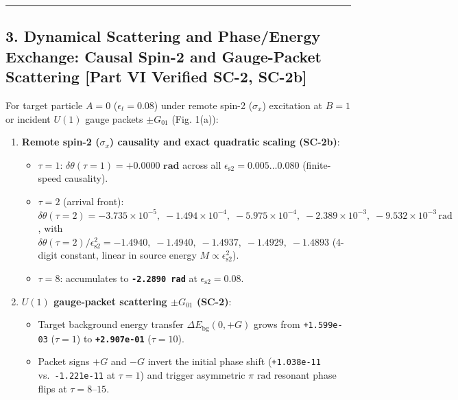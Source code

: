 \documentclass[
  a4paper,
]{article}
\providecommand{\tightlist}{%
  \setlength{\itemsep}{0pt}\setlength{\parskip}{0pt}}
\begin{document}
\begin{center}\rule{0.5\linewidth}{0.5pt}\end{center}

\subsection{3. Dynamical Scattering and Phase/Energy Exchange: Causal
Spin-2 and Gauge-Packet Scattering {[}Part VI Verified SC-2,
SC-2b{]}}\label{dynamical-scattering-and-phaseenergy-exchange-causal-spin-2-and-gauge-packet-scattering-part-vi-verified-sc-2-sc-2b}

For target particle \(A=0\) (\(\epsilon_t = 0.08\)) under remote spin-2
(\(\sigma_x\)) excitation at \(B=1\) or incident \(U(1)\) gauge packets
\(\pm G_{01}\) (Fig. 1(a)):

\begin{enumerate}
\def\labelenumi{\arabic{enumi}.}
\tightlist
\item
  \textbf{Remote spin-2 (\(\sigma_x\)) causality and exact quadratic
  scaling (SC-2b)}:

  \begin{itemize}
  \tightlist
  \item
    \(\tau = 1\):
    \textbf{\(\delta\theta(\tau=1) = \mathbf{+0.0000\text{ rad}}\)}
    across all \(\epsilon_{\mathrm{s2}} = 0.005 \dots 0.080\)
    (finite-speed causality).
  \item
    \(\tau = 2\) (arrival front):
    \(\delta\theta(\tau=2) = -3.735\times 10^{-5},\; -1.494\times 10^{-4},\; -5.975\times 10^{-4},\; -2.389\times 10^{-3},\; -9.532\times 10^{-3}\,\mathrm{rad}\),
    with
    \textbf{\(\delta\theta(\tau=2)/\epsilon_{\mathrm{s2}}^2 = \mathbf{-1.4940,\; -1.4940,\; -1.4937,\; -1.4929,\; -1.4893}\)}
    (4-digit constant, linear in source energy
    \(M \propto \epsilon_{\mathrm{s2}}^2\)).
  \item
    \(\tau = 8\): accumulates to \textbf{\texttt{-2.2890\ rad}} at
    \(\epsilon_{\mathrm{s2}} = 0.08\).
  \end{itemize}
\item
  \textbf{\(U(1)\) gauge-packet scattering \(\pm G_{01}\) (SC-2)}:

  \begin{itemize}
  \tightlist
  \item
    Target background energy transfer \(\Delta E_{\mathrm{bg}}(0, +G)\)
    grows from \texttt{+1.599e-03} (\(\tau=1\)) to
    \textbf{\texttt{+2.907e-01}} (\(\tau=10\)).
  \item
    Packet signs \(+G\) and \(-G\) invert the initial phase shift
    (\texttt{+1.038e-11} vs.~\texttt{-1.221e-11} at \(\tau=1\)) and
    trigger asymmetric \(\pi\text{ rad}\) resonant phase flips at
    \(\tau = 8\text{–}15\).
  \end{itemize}
\end{enumerate}
\end{document}
